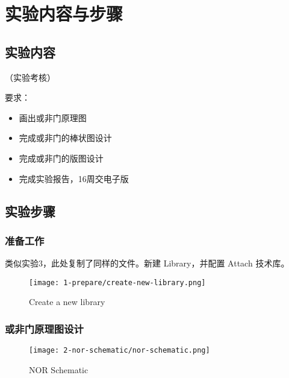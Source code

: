 \documentclass{theme-2614084}
\begin{document}

\makecover


\section{实验内容与步骤}


\subsection{实验内容}

（实验考核）

要求：

\begin{itemize}
  \item 画出或非门原理图
  \item 完成或非门的棒状图设计
  \item 完成或非门的版图设计
  \item 完成实验报告，16周交电子版
\end{itemize}

\subsection{实验步骤}

\subsubsection{准备工作}

类似实验3，此处复制了同样的文件。新建 Library，并配置 Attach 技术库。

\begin{figure}[H]
  \centering\texttt{[image: 1-prepare/create-new-library.png]}
  \caption{Create a new library}
\end{figure}

\subsubsection{或非门原理图设计}

\begin{figure}[H]
  \centering\texttt{[image: 2-nor-schematic/nor-schematic.png]}
  \caption{NOR Schematic}
\end{figure}
\end{document}
